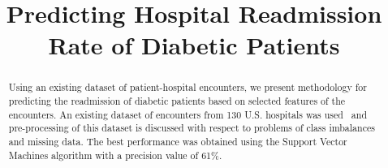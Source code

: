\documentclass[conference]{IEEEtran}
\begin{document}
\title{Predicting Hospital Readmission Rate of Diabetic Patients}


\author{
\and
{}
\and
{}
}

\maketitle

\begin{abstract}

Using an existing dataset of patient-hospital encounters, we present methodology for predicting the readmission of diabetic patients based on selected features of the encounters. An existing dataset of encounters from 130 U.S. hospitals was used~\cite{dataset-2014} and pre-processing of this dataset is discussed with respect to problems of class imbalances and missing data. The best performance was obtained using the Support Vector Machines algorithm with a precision value of 61\%.

\end{abstract}

%
\end{document}

